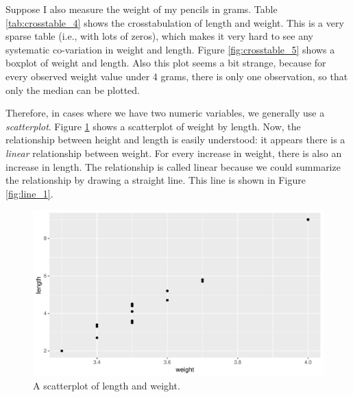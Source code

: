 \documentclass[]{book}\usepackage[]{graphicx}\usepackage[]{color}
\makeatletter
\def\maxwidth{ %
  \ifdim\Gin@nat@width>\linewidth
    \linewidth
  \else
    \Gin@nat@width
  \fi
}
\makeatother
\begin{document}
Suppose I also measure the weight of my pencils in grams. Table \ref{tab:crosstable_4} shows the crosstabulation of length and weight. This is a very sparse table (i.e., with lots of zeros), which makes it very hard to see any systematic co-variation in weight and length. Figure \ref{fig:crosstable_5} shows a boxplot of weight and length. Also this plot seems a bit strange, because for every observed weight value under 4 grams, there is only one observation, so that only the median can be plotted.


Therefore, in cases where we have two numeric variables, we generally use a \textit{scatterplot}. Figure \ref{fig:scatter_1} shows a scatterplot of weight by length. Now, the relationship between height and length is easily understood: it appears there is a \textit{linear} relationship between weight. For every increase in weight, there is also an increase in length. The relationship is called linear because we could summarize the relationship by drawing a straight line. This line is shown in Figure \ref{fig:line_1}.


\begin{figure}

{\centering \includegraphics[width=\maxwidth]{figure/scatter_1-1} 

}

\caption[A scatterplot of length and weight]{A scatterplot of length and weight.}\label{fig:scatter_1}
\end{figure}
\end{document}
